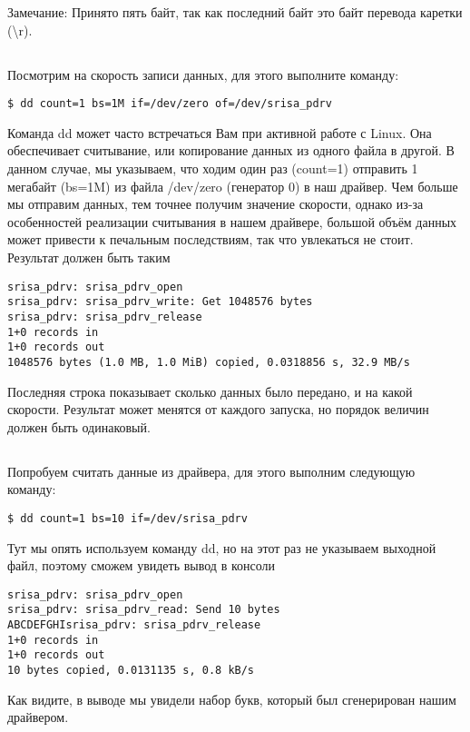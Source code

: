 \vspace{3mm}
\begin{Notes}{Замечание:} 
	Принято пять байт, так как последний байт это байт перевода каретки (\textbackslash{}r). 
\end{Notes}
	
\subsection{}Посмотрим на скорость записи данных, для этого выполните команду:
\begin{lstlisting}[style=bash]
$ dd count=1 bs=1M if=/dev/zero of=/dev/srisa_pdrv 
\end{lstlisting}
Команда dd может часто встречаться Вам при активной работе с Linux. Она обеспечивает считывание, или копирование данных из одного файла в другой. В данном случае, мы указываем, что ходим один раз (count=1) отправить 1 мегабайт (bs=1M)  из файла /dev/zero (генератор 0) в наш драйвер. Чем больше мы отправим данных, тем точнее получим значение скорости, однако из-за особенностей реализации считывания в нашем драйвере, большой объём данных может привести к печальным последствиям, так что увлекаться не стоит. Результат должен быть таким
\begin{lstlisting}[style=stdout]
srisa_pdrv: srisa_pdrv_open
srisa_pdrv: srisa_pdrv_write: Get 1048576 bytes
srisa_pdrv: srisa_pdrv_release 
1+0 records in
1+0 records out
1048576 bytes (1.0 MB, 1.0 MiB) copied, 0.0318856 s, 32.9 MB/s
\end{lstlisting}
Последняя строка показывает сколько данных было передано, и на какой скорости. Результат может менятся от каждого запуска, но порядок величин должен быть одинаковый.

\subsection{}Попробуем считать данные из драйвера, для этого выполним следующую команду: 
\begin{lstlisting}[style=bash]
$ dd count=1 bs=10 if=/dev/srisa_pdrv
\end{lstlisting}
Тут мы опять используем команду dd, но на этот раз не указываем выходной файл, поэтому сможем увидеть вывод в консоли
\begin{lstlisting}[style=stdout]
srisa_pdrv: srisa_pdrv_open 
srisa_pdrv: srisa_pdrv_read: Send 10 bytes 
ABCDEFGHIsrisa_pdrv: srisa_pdrv_release 
1+0 records in 
1+0 records out 
10 bytes copied, 0.0131135 s, 0.8 kB/s
\end{lstlisting}
Как видите, в выводе мы увидели набор букв, который был сгенерирован нашим драйвером.  

